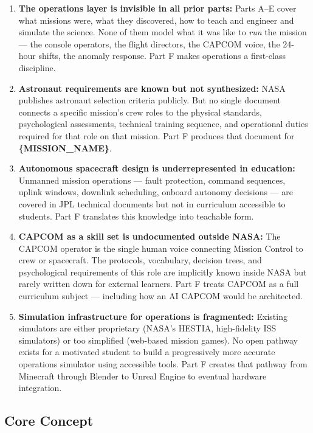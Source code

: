 \documentclass[11pt,letterpaper]{article}
\newcommand{\param}[1]{\textcolor{paramred}{\textbf{\{#1\}}}}
\begin{document}
\begin{enumerate}[leftmargin=*, label=\textbf{P\arabic*.}]
  \item \textbf{The operations layer is invisible in all prior parts:} Parts A--E cover what missions were, what they discovered, how to teach and engineer and simulate the science. None of them model what it was like to \textit{run} the mission --- the console operators, the flight directors, the CAPCOM voice, the 24-hour shifts, the anomaly response. Part F makes operations a first-class discipline.

  \item \textbf{Astronaut requirements are known but not synthesized:} NASA publishes astronaut selection criteria publicly. But no single document connects a specific mission's crew roles to the physical standards, psychological assessments, technical training sequence, and operational duties required for that role on that mission. Part F produces that document for \param{MISSION\_NAME}.

  \item \textbf{Autonomous spacecraft design is underrepresented in education:} Unmanned mission operations --- fault protection, command sequences, uplink windows, downlink scheduling, onboard autonomy decisions --- are covered in JPL technical documents but not in curriculum accessible to students. Part F translates this knowledge into teachable form.

  \item \textbf{CAPCOM as a skill set is undocumented outside NASA:} The CAPCOM operator is the single human voice connecting Mission Control to crew or spacecraft. The protocols, vocabulary, decision trees, and psychological requirements of this role are implicitly known inside NASA but rarely written down for external learners. Part F treats CAPCOM as a full curriculum subject --- including how an AI CAPCOM would be architected.

  \item \textbf{Simulation infrastructure for operations is fragmented:} Existing simulators are either proprietary (NASA's HESTIA, high-fidelity ISS simulators) or too simplified (web-based mission games). No open pathway exists for a motivated student to build a progressively more accurate operations simulator using accessible tools. Part F creates that pathway from Minecraft through Blender to Unreal Engine to eventual hardware integration.
\end{enumerate}

\subsection{Core Concept}
\end{document}
